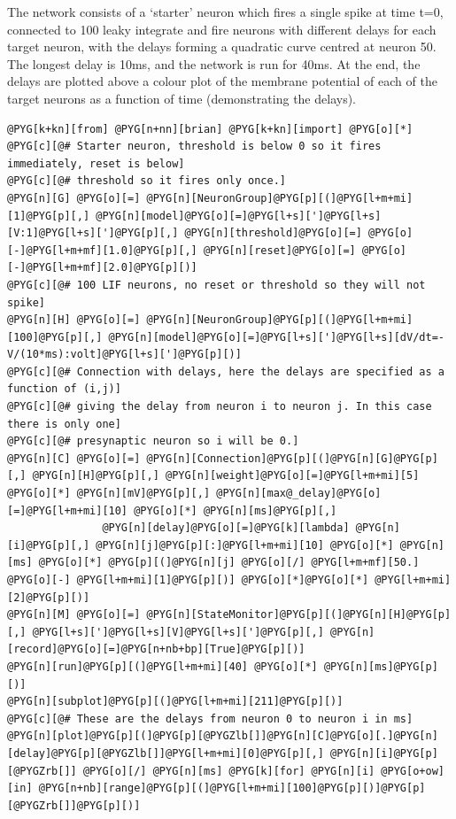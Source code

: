 \documentclass[letterpaper,10pt,english]{manual}
\begin{document}
The network consists of a `starter' neuron which fires a single spike at time
t=0, connected to 100 leaky integrate and fire neurons with different delays
for each target neuron, with the delays forming a quadratic curve centred at
neuron 50. The longest delay is 10ms, and the network is run for 40ms. At
the end, the delays are plotted above a colour plot of the membrane potential
of each of the target neurons as a function of time (demonstrating the
delays).

\begin{Verbatim}[commandchars=@\[\]]
@PYG[k+kn][from] @PYG[n+nn][brian] @PYG[k+kn][import] @PYG[o][*]
@PYG[c][@# Starter neuron, threshold is below 0 so it fires immediately, reset is below]
@PYG[c][@# threshold so it fires only once.]
@PYG[n][G] @PYG[o][=] @PYG[n][NeuronGroup]@PYG[p][(]@PYG[l+m+mi][1]@PYG[p][,] @PYG[n][model]@PYG[o][=]@PYG[l+s][']@PYG[l+s][V:1]@PYG[l+s][']@PYG[p][,] @PYG[n][threshold]@PYG[o][=] @PYG[o][-]@PYG[l+m+mf][1.0]@PYG[p][,] @PYG[n][reset]@PYG[o][=] @PYG[o][-]@PYG[l+m+mf][2.0]@PYG[p][)]
@PYG[c][@# 100 LIF neurons, no reset or threshold so they will not spike]
@PYG[n][H] @PYG[o][=] @PYG[n][NeuronGroup]@PYG[p][(]@PYG[l+m+mi][100]@PYG[p][,] @PYG[n][model]@PYG[o][=]@PYG[l+s][']@PYG[l+s][dV/dt=-V/(10*ms):volt]@PYG[l+s][']@PYG[p][)]
@PYG[c][@# Connection with delays, here the delays are specified as a function of (i,j)]
@PYG[c][@# giving the delay from neuron i to neuron j. In this case there is only one]
@PYG[c][@# presynaptic neuron so i will be 0.]
@PYG[n][C] @PYG[o][=] @PYG[n][Connection]@PYG[p][(]@PYG[n][G]@PYG[p][,] @PYG[n][H]@PYG[p][,] @PYG[n][weight]@PYG[o][=]@PYG[l+m+mi][5] @PYG[o][*] @PYG[n][mV]@PYG[p][,] @PYG[n][max@_delay]@PYG[o][=]@PYG[l+m+mi][10] @PYG[o][*] @PYG[n][ms]@PYG[p][,]
               @PYG[n][delay]@PYG[o][=]@PYG[k][lambda] @PYG[n][i]@PYG[p][,] @PYG[n][j]@PYG[p][:]@PYG[l+m+mi][10] @PYG[o][*] @PYG[n][ms] @PYG[o][*] @PYG[p][(]@PYG[n][j] @PYG[o][/] @PYG[l+m+mf][50.] @PYG[o][-] @PYG[l+m+mi][1]@PYG[p][)] @PYG[o][*]@PYG[o][*] @PYG[l+m+mi][2]@PYG[p][)]
@PYG[n][M] @PYG[o][=] @PYG[n][StateMonitor]@PYG[p][(]@PYG[n][H]@PYG[p][,] @PYG[l+s][']@PYG[l+s][V]@PYG[l+s][']@PYG[p][,] @PYG[n][record]@PYG[o][=]@PYG[n+nb+bp][True]@PYG[p][)]
@PYG[n][run]@PYG[p][(]@PYG[l+m+mi][40] @PYG[o][*] @PYG[n][ms]@PYG[p][)]
@PYG[n][subplot]@PYG[p][(]@PYG[l+m+mi][211]@PYG[p][)]
@PYG[c][@# These are the delays from neuron 0 to neuron i in ms]
@PYG[n][plot]@PYG[p][(]@PYG[p][@PYGZlb[]]@PYG[n][C]@PYG[o][.]@PYG[n][delay]@PYG[p][@PYGZlb[]]@PYG[l+m+mi][0]@PYG[p][,] @PYG[n][i]@PYG[p][@PYGZrb[]] @PYG[o][/] @PYG[n][ms] @PYG[k][for] @PYG[n][i] @PYG[o+ow][in] @PYG[n+nb][range]@PYG[p][(]@PYG[l+m+mi][100]@PYG[p][)]@PYG[p][@PYGZrb[]]@PYG[p][)]

\end{Verbatim}
\end{document}
